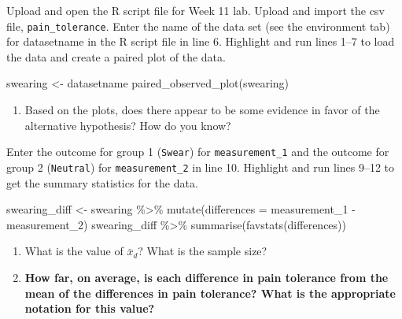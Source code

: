 \documentclass[
]{report}
\newenvironment{Shaded}{\begin{snugshade}}{\end{snugshade}}
\newcommand{\AttributeTok}[1]{\textcolor[rgb]{0.77,0.63,0.00}{#1}}
\newcommand{\FunctionTok}[1]{\textcolor[rgb]{0.00,0.00,0.00}{#1}}
\newcommand{\NormalTok}[1]{#1}
\newcommand{\OtherTok}[1]{\textcolor[rgb]{0.56,0.35,0.01}{#1}}
\newcommand{\SpecialCharTok}[1]{\textcolor[rgb]{0.00,0.00,0.00}{#1}}
\providecommand{\tightlist}{%
  \setlength{\itemsep}{0pt}\setlength{\parskip}{0pt}}
\begin{document}
\vspace{0.5in}

Upload and open the R script file for Week 11 lab. Upload and import the csv file, \texttt{pain\_tolerance}. Enter the name of the data set (see the environment tab) for datasetname in the R script file in line 6. Highlight and run lines 1--7 to load the data and create a paired plot of the data.

\begin{Shaded}
\begin{Highlighting}[]
\NormalTok{swearing }\OtherTok{\textless{}{-}}\NormalTok{ datasetname}
\FunctionTok{paired\_observed\_plot}\NormalTok{(swearing)}
\end{Highlighting}
\end{Shaded}

\begin{enumerate}
\def\labelenumi{\arabic{enumi}.}
\setcounter{enumi}{6}
\tightlist
\item
  Based on the plots, does there appear to be some evidence in favor of the alternative hypothesis? How do you know?
  \vspace{0.4in}
\end{enumerate}

Enter the outcome for group 1 (\texttt{Swear}) for \texttt{measurement\_1} and the outcome for group 2 (\texttt{Neutral}) for \texttt{measurement\_2} in line 10. Highlight and run lines 9--12 to get the summary statistics for the data.

\begin{Shaded}
\begin{Highlighting}[]
\NormalTok{swearing\_diff }\OtherTok{\textless{}{-}}\NormalTok{ swearing }\SpecialCharTok{\%\textgreater{}\%} 
  \FunctionTok{mutate}\NormalTok{(}\AttributeTok{differences =}\NormalTok{ measurement\_1 }\SpecialCharTok{{-}}\NormalTok{ measurement\_2)}
\NormalTok{swearing\_diff }\SpecialCharTok{\%\textgreater{}\%} 
    \FunctionTok{summarise}\NormalTok{(}\FunctionTok{favstats}\NormalTok{(differences))}
\end{Highlighting}
\end{Shaded}

\begin{enumerate}
\def\labelenumi{\arabic{enumi}.}
\setcounter{enumi}{7}
\item
  What is the value of \(\bar{x}_d\)? What is the sample size?
  \vspace{0.25in}
\item
  \textbf{How far, on average, is each difference in pain tolerance from the mean of the differences in pain tolerance? What is the appropriate notation for this value?}
\end{enumerate}
\end{document}
